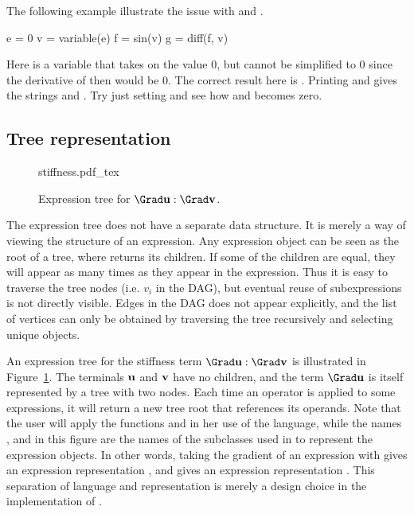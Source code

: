 The following example illustrate the issue with  and .
\begin{python}
e = 0
v = variable(e)
f = sin(v)
g = diff(f, v)
\end{python}
Here  is a variable that takes on the value 0, but
 cannot be simplified to 0 since the derivative of
 then would be 0.  The correct result here is . Printing  and  gives the strings
 and .
Try just setting  and see how  and 
becomes zero.

\subsection{Tree representation}

\begin{figure}[tb]
\def\svgwidth{\largefig}
{stiffness.pdf_tex}
\caption{Expression tree for $\Grad \uu : \Grad \vv$.}
\label{ufl:fig:stiffness}
\end{figure}

The expression tree does not have a separate data structure. It is
merely a way of viewing the structure of an expression. Any expression
object  can be seen as the root of a tree, where
 returns its children. If some of the children are
equal, they will appear as many times as they appear in the
expression. Thus it is easy to traverse the tree nodes (i.e. $v_i$ in
the DAG), but eventual reuse of subexpressions is not directly
visible. Edges in the DAG does not appear explicitly, and the list of
vertices can only be obtained by traversing the tree recursively and
selecting unique objects.

An expression tree for the stiffness term $\Grad\uu :\Grad\vv$ is
illustrated in Figure~\ref{ufl:fig:stiffness}.  The terminals $\mathbf{u}$
and $\mathbf{v}$ have no children, and the term $\Grad\uu$ is itself
represented by a tree with two nodes. Each time an operator is applied
to some expressions, it will return a new tree root that references
its operands. Note that the user will apply the functions 
and  in her use of the language, while the names
,  and  in this figure
are the names of the  subclasses used in \ufl{} to
represent the expression objects.  In other words, taking the gradient
of an expression with  gives an expression
representation , and  gives an
expression representation . This separation of
language and representation is merely a design choice in the
implementation of \ufl{}.


